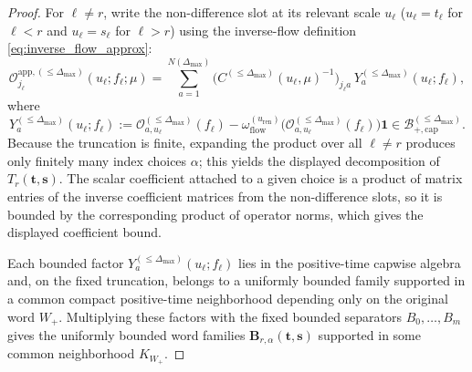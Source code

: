 \begin{proof}
For $\ell\ne r$, write the non-difference slot at its relevant scale $u_\ell$ ($u_\ell=t_\ell$ for $\ell<r$ and $u_\ell=s_\ell$ for $\ell>r$) using the inverse-flow definition \eqref{eq:inverse_flow_approx}:
\[
\mathcal O_{j_\ell}^{\mathrm{app},(\le \Delta_{\max})}(u_\ell;f_\ell;\mu)
=
\sum_{a=1}^{N(\Delta_{\max})}
\bigl(C^{(\le \Delta_{\max})}(u_\ell,\mu)^{-1}\bigr)_{j_\ell a}\,
Y_a^{(\le \Delta_{\max})}(u_\ell;f_\ell),
\]
where
\[
Y_a^{(\le \Delta_{\max})}(u_\ell;f_\ell)
:=
\mathcal O_{a,u_\ell}^{(\le \Delta_{\max})}(f_\ell)
-
\omega_{\mathrm{flow}}^{(u_{\mathrm{ren}})}\!\bigl(\mathcal O_{a,u_\ell}^{(\le \Delta_{\max})}(f_\ell)\bigr)\mathbf 1
\in\mathcal B^{(\le \Delta_{\max})}_{+,\mathrm{cap}}.
\]
Because the truncation is finite, expanding the product over all $\ell\ne r$ produces only finitely many index choices $\alpha$; this yields the displayed decomposition of $T_r(\mathbf t,\mathbf s)$.
The scalar coefficient attached to a given choice is a product of matrix entries of the inverse coefficient matrices from the non-difference slots, so it is bounded by the corresponding product of operator norms, which gives the displayed coefficient bound.

Each bounded factor $Y_a^{(\le \Delta_{\max})}(u_\ell;f_\ell)$ lies in the positive-time capwise algebra and, on the fixed truncation, belongs to a uniformly bounded family supported in a common compact positive-time neighborhood depending only on the original word $W_+$.
Multiplying these factors with the fixed bounded separators $B_0,\dots,B_m$ gives the uniformly bounded word families $\mathbf B_{r,\alpha}(\mathbf t,\mathbf s)$ supported in some common neighborhood $K_{W_+}$.


\end{proof}
